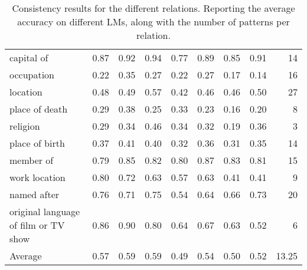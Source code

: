 \begin{table*}[t]
{\begin{tabular}{lrrrrrrrr}
                           capital of &       0.87 &        0.92 &            0.94 &          0.77 &           0.89 &         0.85 &            0.91 &  14 \\
                           occupation &       0.22 &        0.35 &            0.27 &          0.22 &           0.27 &         0.17 &            0.14 &  16 \\
                             location &       0.48 &        0.49 &            0.57 &          0.42 &           0.46 &         0.46 &            0.50 &  27 \\
                       place of death &       0.29 &        0.38 &            0.25 &          0.33 &           0.23 &         0.16 &            0.20 &   8 \\
                             religion &       0.29 &        0.34 &            0.46 &          0.34 &           0.32 &         0.19 &            0.36 &   3 \\
                       place of birth &       0.37 &        0.41 &            0.40 &          0.32 &           0.36 &         0.31 &            0.35 &  14 \\
                            member of &       0.79 &        0.85 &            0.82 &          0.80 &           0.87 &         0.83 &            0.81 &  15 \\
                        work location &       0.80 &        0.72 &            0.63 &          0.57 &           0.63 &         0.41 &            0.41 &   9 \\
                          named after &       0.76 &        0.71 &            0.75 &          0.54 &           0.64 &         0.66 &            0.73 &  20 \\
 original language of film or TV show &       0.86 &        0.90 &            0.80 &          0.64 &           0.67 &         0.63 &            0.52 &   6 \\
 \midrule
 Average & 0.57 & 0.59 & 0.59 & 0.49 & 0.54 & 0.50 & 0.52 & 13.25 \\
 
\bottomrule
\end{tabular}
}
    \caption{Consistency results for the different relations. Reporting the average accuracy on different LMs, along with the number of patterns per relation.}
    \label{tab:entailment-main}
\end{table*}